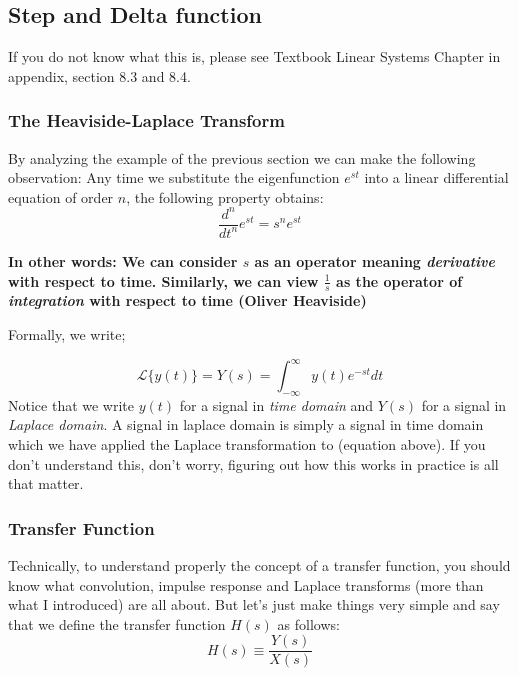 \subsection{Step and Delta function}

If you do not know what this is, please see Textbook Linear Systems Chapter in appendix, section 8.3 and 8.4.

\subsubsection{The Heaviside-Laplace Transform}

By analyzing the example of the previous section we can make
the following observation: Any time we substitute the eigenfunction $e^{st}$ into a
linear differential equation of order $n$, the following property obtains:
\begin{equation}
    \frac{d^n}{dt^n}e^{st} = s^ne^{st}
\end{equation}

\textbf{In other words: We can consider $s$ as an operator meaning \textit{derivative} with respect to time. Similarly, we can view $\frac{1}{s}$ as the operator of \textit{integration} with respect to time (Oliver Heaviside)}

Formally, we write; 

\begin{equation}
    \mathscr{L}\{y(t)\}=Y(s)= \int_{-\infty}^{\infty} {y(t)e^{-st}} dt
\end{equation}
Notice that we write $y(t)$ for a signal in \textit{time domain} and $Y(s)$ for a signal in \textit{Laplace domain}. A signal in laplace domain is simply a signal in time domain which we have applied the Laplace transformation to (equation above). If you don't understand this, don't worry, figuring out how this works in practice is all that matter.  

\subsubsection{Transfer Function}

Technically, to understand properly the concept of a transfer function, you should know what convolution, impulse response and Laplace transforms (more than what I introduced) are all about. But let's just make things very simple and say that we define the transfer function $H(s)$ as follows: 
\begin{equation}
    H(s) \equiv \frac{Y(s)}{X(s)}
\end{equation}


